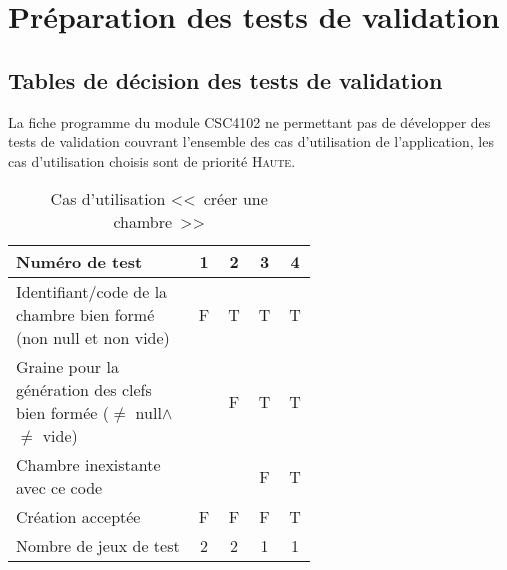 \documentclass[11pt,article]{article}
\newcommand{\nullvalue}{\textsf{null}\xspace}
\begin{document}
\newpage

\section{Préparation des tests de validation}

\subsection{Tables de décision des tests de validation}

La fiche programme du module CSC4102 ne permettant pas de développer
des tests de validation couvrant l'ensemble des cas d'utilisation de
l'application, les cas d'utilisation choisis sont de priorité
\textsc{Haute}.

\begin{table}[htbp!]
\begin{tabular}{|p{0.6\linewidth}|c|c|c|c|}
\hline
Numéro de test
&1&2&3&4\\
\hline
\hline
Identifiant/code de la chambre bien formé (non \nullvalue et non vide)
&F&T&T&T\\
\hline
Graine pour la génération des clefs bien formée ($\neq$ \nullvalue $\land$ $\neq$ vide)
& &F&T&T\\
\hline
Chambre inexistante avec ce code
& & &F&T\\
\hline
\hline
Création acceptée
&F&F&F&T\\
\hline
\hline
Nombre de jeux de test
&2&2&1&1\\
\hline
\end{tabular}
\caption{Cas d'utilisation <<~créer une chambre~>>}
\end{table}
\end{document}
